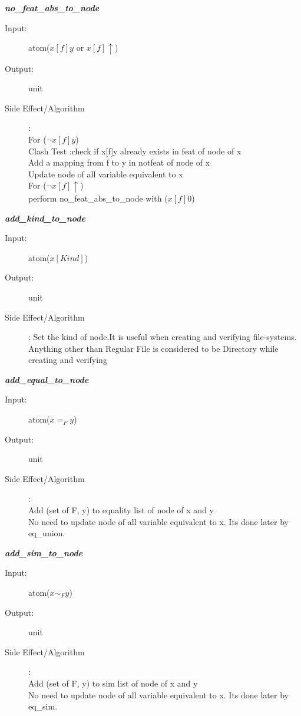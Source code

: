 \documentclass[12pt]{article}
\begin{document}
\begin{description}
\item \textbf{\textit{no\_feat\_abs\_to\_node}}
\begin{description}
    \item[Input:] atom($x[f]y$ or $x[f]\uparrow$)
    \item[Output:] unit
    \item[Side Effect/Algorithm]:\\For ($\lnot x[f]y$)\\ 
	Clash Test :check if x[f]y already exists in feat of node of x\\
	Add a mapping from f to y in notfeat of node of x\\
	Update node of all variable equivalent to x\\
	For ($\lnot x[f]\uparrow$)\\ perform no\_feat\_abs\_to\_node with ($x[f]0$)\\
\end{description}

\item \textbf{\textit{add\_kind\_to\_node}}
\begin{description}
    \item[Input:] atom($x[Kind]$)
    \item[Output:] unit
    \item[Side Effect/Algorithm]: Set the kind of node.It is useful when creating and verifying file-systems. Anything other than Regular File is considered to be Directory while creating and verifying
\end{description}

\item \textbf{\textit{add\_equal\_to\_node}}
\begin{description}
    \item[Input:] atom($x=_F y$)
    \item[Output:] unit
    \item[Side Effect/Algorithm]:\\Add (set of F, y) to equality list of node of x and y\\
	No need to update node of all variable equivalent to x. Its done later by eq\_union.\\
\end{description}

\item \textbf{\textit{add\_sim\_to\_node}}
\begin{description}
    \item[Input:] atom($x\sim_F y$)
    \item[Output:] unit
    \item[Side Effect/Algorithm]:\\Add (set of F, y) to sim list of node of x and y\\
	No need to update node of all variable equivalent to x. Its done later by eq\_sim.
\end{description}



\end{description}
\end{document}
